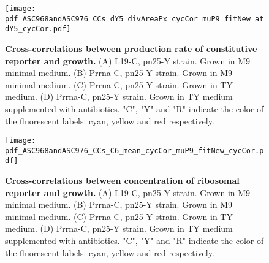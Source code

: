 \begin{figure}
    \centering
    \texttt{[image: pdf\_ASC968andASC976\_CCs\_dY5\_divAreaPx\_cycCor\_muP9\_fitNew\_atdY5\_cycCor.pdf]}
    \caption{ 
        \textbf{Cross-correlations between production rate of constitutive reporter and growth.}
        (A) L19-C, pn25-Y strain. Grown in M9 minimal medium.
        (B) Prrna-C, pn25-Y strain. Grown in M9 minimal medium.
        (C) Prrna-C, pn25-Y strain. Grown in TY medium.
        (D) Prrna-C, pn25-Y strain. Grown in TY medium supplemented with antibiotics.
        "C", "Y" and "R" indicate the color of the fluorescent labels: cyan, yellow and red respectively.
    }
    \label{fig:ribo:CCsPmuYpn25}
\end{figure}



\begin{figure}
    \centering
    \texttt{[image: pdf\_ASC968andASC976\_CCs\_C6\_mean\_cycCor\_muP9\_fitNew\_cycCor.pdf]}
    \caption{ 
        \textbf{Cross-correlations between concentration of ribosomal reporter and growth.}
        (A) L19-C, pn25-Y strain. Grown in M9 minimal medium.
        (B) Prrna-C, pn25-Y strain. Grown in M9 minimal medium.
        (C) Prrna-C, pn25-Y strain. Grown in TY medium.
        (D) Prrna-C, pn25-Y strain. Grown in TY medium supplemented with antibiotics.
        "C", "Y" and "R" indicate the color of the fluorescent labels: cyan, yellow and red respectively.
    }
    \label{fig:ribo:CCsEmuYRibo}
\end{figure}

